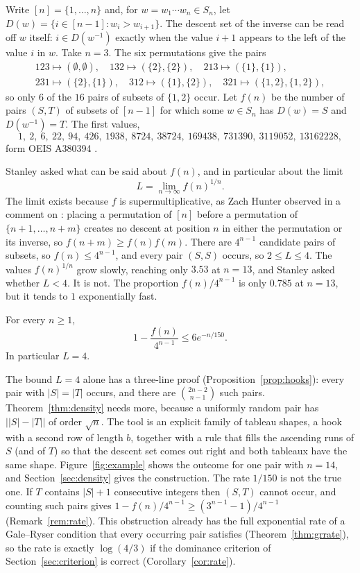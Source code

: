 \documentclass[12pt]{article}
\numberwithin{theorem}{section}
\numberwithin{equation}{section}
\begin{document}
Write $[n]=\{1,\dots,n\}$ and, for $w=w_1\cdots w_n\in S_n$, let $D(w)=\{i\in[n-1]: w_i>w_{i+1}\}$. The
descent set of the inverse can be read off $w$ itself: $i\in D(w^{-1})$ exactly when the value $i+1$ appears
to the left of the value $i$ in $w$. Take $n=3$. The six
permutations give the pairs
\begin{gather*}
123\mapsto(\emptyset,\emptyset),\quad 132\mapsto(\{2\},\{2\}),\quad 213\mapsto(\{1\},\{1\}),\\
231\mapsto(\{2\},\{1\}),\quad 312\mapsto(\{1\},\{2\}),\quad 321\mapsto(\{1,2\},\{1,2\}),
\end{gather*}
so only $6$ of the $16$ pairs of subsets of $\{1,2\}$ occur. Let $f(n)$ be the number of pairs $(S,T)$ of
subsets of $[n-1]$ for which some $w\in S_n$ has $D(w)=S$ and $D(w^{-1})=T$. The first values,
\[
1,\ 2,\ 6,\ 22,\ 94,\ 426,\ 1938,\ 8724,\ 38724,\ 169438,\ 731390,\ 3119052,\ 13162228,
\]
form OEIS A380394 \cite{oeisA380394}.

Stanley \cite{stanleyMO} asked what can be said about $f(n)$, and in particular about the limit
\[
L=\lim_{n\to\infty}f(n)^{1/n}.
\] The limit exists because $f$ is supermultiplicative, as Zach Hunter observed in a comment on \cite{stanleyMO}: placing a permutation of
$[n]$ before a permutation of $\{n+1,\dots,n+m\}$ creates no descent at position $n$ in either the
permutation or its inverse, so $f(n+m)\ge f(n)f(m)$. There are $4^{n-1}$ candidate pairs of subsets, so $f(n)\le 4^{n-1}$, and every pair $(S,S)$
occurs, so $2\le L\le4$. The values $f(n)^{1/n}$ grow slowly, reaching only $3.53$ at $n=13$, and
Stanley asked whether $L<4$. It is not. The proportion $f(n)/4^{n-1}$ is only $0.785$ at $n=13$, but it tends
to $1$ exponentially fast.

\begin{theorem}\label{thm:density}
For every $n\ge1$,
\[
1-\frac{f(n)}{4^{n-1}}\le 6e^{-n/150}.
\]
In particular $L=4$.
\end{theorem}

The bound $L=4$ alone has a three-line proof (Proposition~\ref{prop:hooks}): every pair with $|S|=|T|$
occurs, and there are $\binom{2n-2}{n-1}$ such pairs. Theorem~\ref{thm:density} needs more, because a
uniformly random pair has $\bigl||S|-|T|\bigr|$ of order $\sqrt n$. The tool is an explicit family of
tableau shapes, a hook with a second row of length $b$, together with a rule that fills the ascending runs of
$S$ (and of $T$) so that the descent set comes out right and both tableaux have the same shape.
Figure~\ref{fig:example} shows the outcome for one pair with $n=14$, and Section~\ref{sec:density} gives the
construction.
The rate $1/150$ is not the true one. If $T$ contains $|S|+1$ consecutive integers then $(S,T)$ cannot occur,
and counting such pairs gives $1-f(n)/4^{n-1}\ge(3^{n-1}-1)/4^{n-1}$ (Remark~\ref{rem:rate}). This obstruction
already has the full exponential rate of a Gale--Ryser condition that every occurring pair satisfies
(Theorem~\ref{thm:grrate}), so the rate is exactly $\log(4/3)$ if the dominance criterion of
Section~\ref{sec:criterion} is correct (Corollary~\ref{cor:rate}).
\end{document}
